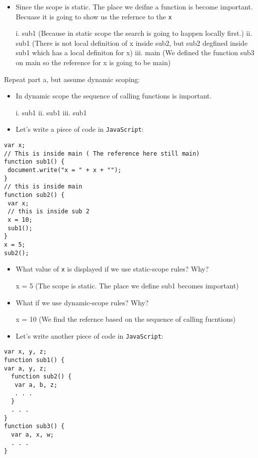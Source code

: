 \documentclass[11pt]{article}
\begin{document}
\begin{itemize}
\item Since the scope is static. The place we deifne a function is become important.
Becuase it is going to show us the refernce to the \texttt{x}

i. sub1 (Because in static scope the search is going to happen locally first.)
ii. sub1 (There is not local definition of x inside sub2, but sub2 degfined
 inside sub1 which has a local definiton for x)
iii. main (We defined the function sub3 on main so the reference for x is going
 to be main)
\end{itemize}

Repeat part a, but assume dynamic scoping:

\begin{itemize}
\item In dynamic scope the sequence of calling functions is important.

i. sub1
ii. sub1
iii. sub1

\item Let's write a piece of code in \texttt{JavaScript}:
\end{itemize}

\begin{verbatim}
var x;
// This is inside main ( The reference here still main)
function sub1() {
 document.write("x = " + x + "");
}
// this is inside main
function sub2() {
 var x;
 // this is inside sub 2
 x = 10;
 sub1();
}
x = 5;
sub2();
\end{verbatim}

\begin{itemize}
\item What value of \texttt{x} is displayed if we use static-scope rules? Why?

x = 5 (The scope is static. The place we define sub1 becomes important)

\item What if we use dynamic-scope rules? Why?

x = 10 (We find the refernce based on the sequence of calling fucntions)

\item Let's write another piece of code in \texttt{JavaScript}:
\end{itemize}

\begin{verbatim}
var x, y, z;
function sub1() {
var a, y, z;
  function sub2() {
   var a, b, z;
   . . .
  }
  . . .
}
function sub3() {
  var a, x, w;
  . . .
}
\end{verbatim}
\end{document}
